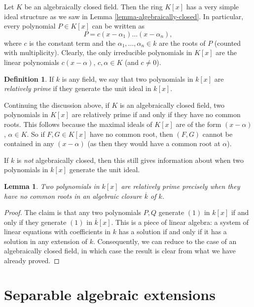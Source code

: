 \documentclass{stacks-project}
\theoremstyle{plain}
\newtheorem{lemma}[subsection]{Lemma}
\theoremstyle{definition}
\newtheorem{definition}[subsection]{Definition}
\theoremstyle{remark}
\numberwithin{equation}{subsection}
\begin{document}
\noindent
Let $K$ be an algebraically closed field. Then the ring $K[x]$ has a very
simple ideal structure as we saw in Lemma \ref{lemma-algebraically-closed}.
In particular, every polynomial $P \in K[x]$ can be written as
$$
P = c(x - \alpha_1) \ldots (x - \alpha_n),
$$
where $c$ is the constant term and the $\alpha_1, \ldots, \alpha_n \in k$
are the roots of $P$ (counted with multiplicity). Clearly, the only irreducible
polynomials in $K[x]$ are the linear polynomials $c(x - \alpha)$,
$c, \alpha \in K$ (and $c \neq 0$).

\begin{definition}
\label{definition-relatively-prime}
If $k$ is any field, we say that two polynomials in $k[x]$ are
{\it relatively prime} if they generate the unit ideal in $k[x]$.
\end{definition}

\noindent
Continuing the discussion above, if $K$ is an algebraically closed field,
two polynomials in $K[x]$ are relatively prime if and only if they have no
common roots. This follows because the maximal ideals of $K[x]$ are of the form
$(x - \alpha)$, $\alpha \in K$. So if $F, G \in K[x]$ have no common root,
then $(F, G)$ cannot be contained in any $(x - \alpha)$ (as then they would
have a common root at $\alpha$).

\medskip\noindent
If $k$ is {\it not} algebraically closed, then this still gives
information about when two polynomials in $k[x]$ generate the unit ideal.

\begin{lemma}
\label{lemma-relatively-prime-polynomials}
Two polynomials in $k[x]$ are relatively prime precisely when they
have no common roots in an algebraic closure $\overline{k}$ of $k$.
\end{lemma}

\begin{proof}
The claim is that any two polynomials $P, Q$ generate $(1)$ in $k[x]$ if and
only if they generate $(1)$ in $\overline{k}[x]$. This is a piece of
linear algebra: a system of linear equations with coefficients in $k$ has
a solution if and only if it has a solution in any extension of $k$.
Consequently, we can reduce to the case of an algebraically closed field, in
which case the result is clear from what we have already proved.
\end{proof}





\section{Separable algebraic extensions}
\label{section-separable-extensions}
\end{document}
